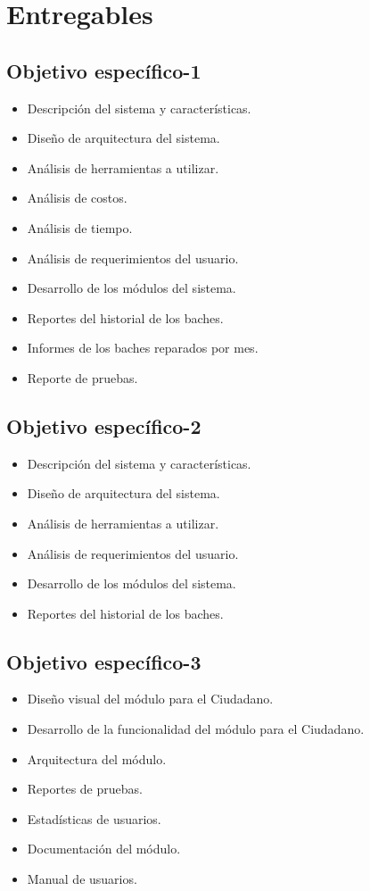 \chapter{Entregables}

\section{Objetivo específico-1}
\begin{itemize}
    \item Descripción del sistema y características. 
    \item Diseño de arquitectura del sistema.
    \item Análisis de herramientas a utilizar.
    \item Análisis de costos.
    \item Análisis de tiempo.
    \item Análisis de requerimientos del usuario.
    \item Desarrollo de los módulos del sistema.
    \item Reportes del historial de los baches.
    \item Informes de los baches reparados por mes.
    \item Reporte de pruebas.
\end{itemize}

\section{Objetivo específico-2}
\begin{itemize}
    \item Descripción del sistema y características. 
    \item Diseño de arquitectura del sistema.
    \item Análisis de herramientas a utilizar.
    \item Análisis de requerimientos del usuario.
    \item Desarrollo de los módulos del sistema.
    \item Reportes del historial de los baches.
\end{itemize}

\section{Objetivo específico-3}
\begin{itemize}
    \item Diseño visual del módulo para el Ciudadano. 
    \item Desarrollo de la funcionalidad del módulo para el Ciudadano.
    \item Arquitectura del módulo.
    \item Reportes de pruebas.
    \item Estadísticas de usuarios.
    \item Documentación del módulo.
    \item Manual de usuarios.
\end{itemize}

